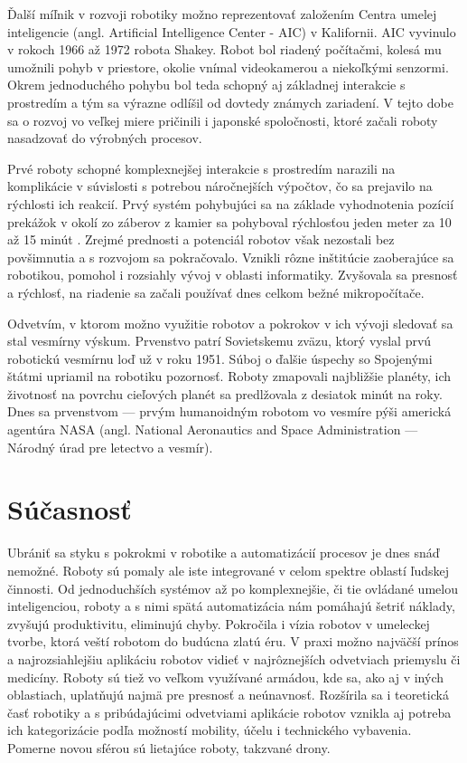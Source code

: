Ďalší míľnik v rozvoji robotiky možno reprezentovať založením Centra umelej inteligencie (angl. Artificial Intelligence Center - AIC) v Kalifornii. AIC vyvinulo v rokoch 1966 až 1972 robota Shakey. Robot bol riadený počítačmi, kolesá mu umožnili pohyb v priestore, okolie vnímal videokamerou a niekoľkými senzormi. Okrem jednoduchého pohybu bol teda schopný aj základnej interakcie s prostredím a tým sa výrazne odlíšil od dovtedy známych zariadení. V tejto dobe sa o rozvoj vo veľkej miere pričinili i japonské spoločnosti, ktoré začali roboty nasadzovať do výrobných procesov.

Prvé roboty schopné komplexnejšej interakcie s prostredím narazili na komplikácie v súvislosti s potrebou náročnejších výpočtov, čo sa prejavilo na rýchlosti ich reakcií. Prvý systém pohybujúci sa na základe vyhodnotenia pozícií prekážok v okolí zo záberov z kamier sa pohyboval rýchlosťou jeden meter za 10 až 15 minút \cite{RoboticsAndAutomationHandbook}. Zrejmé prednosti a potenciál robotov však nezostali bez povšimnutia a s rozvojom sa pokračovalo. Vznikli rôzne inštitúcie zaoberajúce sa robotikou, pomohol i rozsiahly vývoj v oblasti informatiky. Zvyšovala sa presnosť a rýchlosť, na riadenie sa začali používať dnes celkom bežné mikropočítače.

Odvetvím, v ktorom možno využitie robotov a pokrokov v ich vývoji sledovať sa stal vesmírny výskum. Prvenstvo patrí Sovietskemu zväzu, ktorý vyslal prvú robotickú vesmírnu loď už v roku 1951. Súboj o ďalšie úspechy so Spojenými štátmi upriamil na robotiku pozornosť. Roboty zmapovali najbližšie planéty, ich životnosť na povrchu cieľových planét sa predlžovala z desiatok minút na roky. Dnes sa prvenstvom --- prvým humanoidným robotom vo vesmíre pýši americká agentúra NASA (angl. National Aeronautics and Space Administration --- Národný úrad pre letectvo a vesmír).

\section{Súčasnosť}
Ubrániť sa styku s pokrokmi v robotike a automatizácií procesov je dnes snáď nemožné. Roboty sú pomaly ale iste integrované v celom spektre oblastí ľudskej činnosti. Od jednoduchších systémov až po komplexnejšie, či tie ovládané umelou inteligenciou, roboty a s nimi spätá automatizácia nám pomáhajú šetriť náklady, zvyšujú produktivitu, eliminujú chyby. Pokročila i vízia robotov v umeleckej tvorbe, ktorá veští robotom do budúcna zlatú éru. V praxi možno najväčší prínos a najrozsiahlejšiu aplikáciu robotov vidieť v najrôznejších odvetviach priemyslu či medicíny. Roboty sú tiež vo veľkom využívané armádou, kde sa, ako aj v iných oblastiach, uplatňujú najmä pre presnosť a neúnavnosť. Rozšírila sa i teoretická časť robotiky a s pribúdajúcimi odvetviami aplikácie robotov vznikla aj potreba ich kategorizácie podľa možností mobility, účelu i technického vybavenia. Pomerne novou sférou sú lietajúce roboty, takzvané drony.

